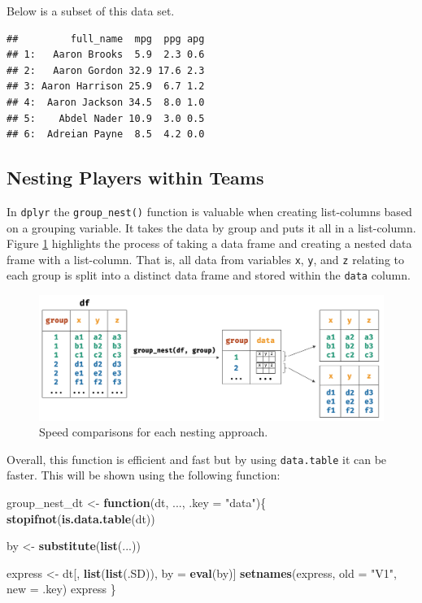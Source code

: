 \documentclass[doc]{apa6}
\newenvironment{Shaded}{\begin{snugshade}}{\end{snugshade}}
\newcommand{\ControlFlowTok}[1]{\textcolor[rgb]{0.13,0.29,0.53}{\textbf{#1}}}
\newcommand{\DataTypeTok}[1]{\textcolor[rgb]{0.13,0.29,0.53}{#1}}
\newcommand{\KeywordTok}[1]{\textcolor[rgb]{0.13,0.29,0.53}{\textbf{#1}}}
\newcommand{\NormalTok}[1]{#1}
\newcommand{\StringTok}[1]{\textcolor[rgb]{0.31,0.60,0.02}{#1}}
\begin{document}
Below is a subset of this data set.

\begin{verbatim}
##         full_name  mpg  ppg apg
## 1:   Aaron Brooks  5.9  2.3 0.6
## 2:   Aaron Gordon 32.9 17.6 2.3
## 3: Aaron Harrison 25.9  6.7 1.2
## 4:  Aaron Jackson 34.5  8.0 1.0
## 5:    Abdel Nader 10.9  3.0 0.5
## 6:  Adreian Payne  8.5  4.2 0.0
\end{verbatim}

\hypertarget{nesting-players-within-teams}{%
\subsection{Nesting Players within Teams}\label{nesting-players-within-teams}}

In \texttt{dplyr} the \texttt{group\_nest()} function is valuable when creating list-columns based on a grouping variable. It takes the data by group and puts it all in a list-column. Figure \ref{process} highlights the process of taking a data frame and creating a nested data frame with a list-column. That is, all data from variables \texttt{x}, \texttt{y}, and \texttt{z} relating to each group is split into a distinct data frame and stored within the \texttt{data} column.

\begin{figure}[htb]
  \centering
  \includegraphics[width=\textwidth]{fig_process.png}
  \caption{Speed comparisons for each nesting approach.}
  \label{process}
\end{figure}

Overall, this function is efficient and fast but by using \texttt{data.table} it can be faster. This will be shown using the following function:

\begin{Shaded}
\begin{Highlighting}[]
\NormalTok{group_nest_dt <-}\StringTok{ }\ControlFlowTok{function}\NormalTok{(dt, ..., }\DataTypeTok{.key =} \StringTok{"data"}\NormalTok{)\{}
  \KeywordTok{stopifnot}\NormalTok{(}\KeywordTok{is.data.table}\NormalTok{(dt))}

\NormalTok{  by <-}\StringTok{ }\KeywordTok{substitute}\NormalTok{(}\KeywordTok{list}\NormalTok{(...))}
  
\NormalTok{  express <-}\StringTok{ }\NormalTok{dt[, }\KeywordTok{list}\NormalTok{(}\KeywordTok{list}\NormalTok{(.SD)), by =}\StringTok{ }\KeywordTok{eval}\NormalTok{(by)]}
  \KeywordTok{setnames}\NormalTok{(express, }\DataTypeTok{old =} \StringTok{"V1"}\NormalTok{, }\DataTypeTok{new =}\NormalTok{ .key)}
\NormalTok{  express}
\NormalTok{\}}
\end{Highlighting}
\end{Shaded}
\end{document}
